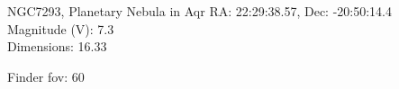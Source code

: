 \begin{block}{NGC7293, Planetary Nebula in Aqr}
    RA: 22:29:38.57, Dec: -20:50:14.4 \\ 
    Magnitude (V): 7.3 \\ 
    Dimensions: 16.33 

    Finder fov: 60 
\end{block}